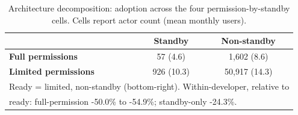\begin{table}[t]
  \centering
  \caption{Architecture decomposition: adoption across the four
    permission-by-standby cells. Cells report actor count (mean monthly users).}
  \label{tab:architecture_2x2}
  \small
  \begin{tabular}{lcc}
    \toprule
    & \textbf{Standby} & \textbf{Non-standby} \\
    \midrule
    \textbf{Full permissions} & 57 (4.6) & 1,602 (8.6) \\
    \textbf{Limited permissions} & 926 (10.3) & 50,917 (14.3) \\
    \bottomrule
    \multicolumn{3}{l}{\footnotesize Ready = limited, non-standby (bottom-right). Within-developer, relative to} \\
    \multicolumn{3}{l}{\footnotesize ready: full-permission -50.0\% to -54.9\%; standby-only -24.3\%.}
  \end{tabular}
\end{table}